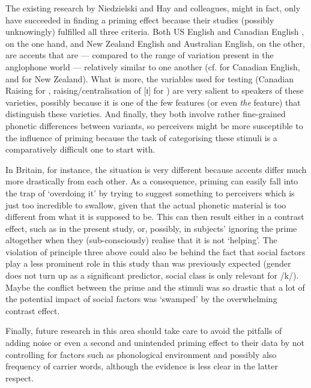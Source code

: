 The existing research by Niedzielski and Hay and colleagues, might in fact, only have succeeded in finding a priming effect because their studies (possibly unknowingly) fulfilled all three criteria.
Both US English and Canadian English , on the one hand, and New Zealand English and Australian English, on the other, are accents that are --- compared to the range of variation present in the anglophone world --- relatively similar to one another (cf. \citealt[31]{halford2002} for Canadian English, and \citealt[354]{hayetal2006a}for New Zealand).
What is more, the variables used for testing (Canadian Raising for \citealt{niedzielski1999}, raising/centralisation of [ɪ] for \citealt{hayetal2006a,haydrager2010}) are very salient to speakers of these varieties, possibly because it is one of the few features (or even \emph{the} feature) that distinguish these varieties.
And finally, they both involve rather fine-grained phonetic differences between variants, so perceivers might be more susceptible to the influence of priming because the task of categorising these stimuli is a comparatively difficult one to start with.

In Britain, for instance, the situation is very different because accents differ much more drastically from each other.
As a consequence, priming can easily fall into the trap of `overdoing it' by trying to suggest something to perceivers which is just too incredible to swallow, given that the actual phonetic material is too different from what it is supposed to be.
This can then result either in a contrast effect, such as in the present study, or, possibly, in subjects' ignoring the prime altogether \parencite[like in][]{lawrence2015} when they (sub-consciously) realise that it is not `helping'.
The violation of principle three above could also be behind the fact that social factors play a less prominent role in this study than was previously expected (gender does not turn up as a significant predictor, social class is only relevant for /k/).
Maybe the conflict between the prime and the stimuli was so drastic that a lot of the potential impact of social factors was `swamped' by the overwhelming contrast effect.

Finally, future research in this area should take care to avoid the pitfalls of adding noise or even a second and unintended priming effect to their data by not controlling for factors such as phonological environment and possibly also frequency of carrier words, although the evidence is less clear in the latter respect.

